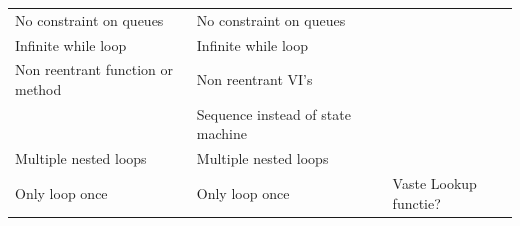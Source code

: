 \documentclass[10pt,conference,compsocconf]{IEEEtran}
\begin{document}
\begin{table}[h]
\begin{tabular}{llll}
\rowcolor[HTML]{F8A102} 
{\color[HTML]{333333} No constraint on queues}                                    & {\color[HTML]{333333} No constraint on queues}                                                     &             &                                                 \\
\rowcolor[HTML]{F8A102} 
{\color[HTML]{333333} Infinite while loop}                                        & {\color[HTML]{333333} Infinite while loop}                                                         &             &                                                 \\
Non reentrant function or method                                                  & Non reentrant VI's                                                                                 &             & \cellcolor[HTML]{333333}{\color[HTML]{333333} } \\
\cellcolor[HTML]{333333}                                                          & Sequence instead of state machine                                                                  &             & \cellcolor[HTML]{333333}{\color[HTML]{333333} } \\
Multiple nested loops                                                             & Multiple nested loops                                                                              &             &                                                 \\
\rowcolor[HTML]{F8A102} 
Only loop once                                                                    & Only loop once                                                                                     &             & Vaste Lookup functie?                          
\end{tabular}
\end{table}

\newpage
\balance


\end{document}

